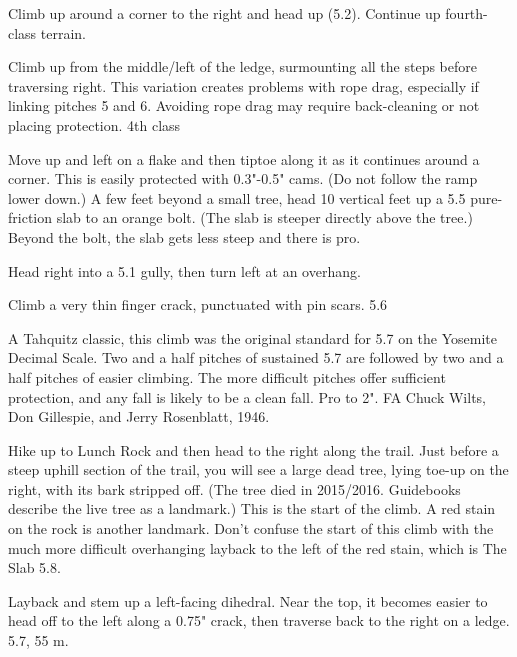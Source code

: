\documentclass{tahquitz}
\begin{document}
 Climb up around a corner to the right and head up (5.2).
Continue up fourth-class terrain.

 Climb up from the middle/left of the ledge, surmounting all the steps
before traversing right. This variation creates problems with rope drag, especially
if linking pitches 5 and 6. Avoiding rope drag may require back-cleaning or not
placing protection. 4th class

 Move up and left on a flake and then tiptoe along it as it
continues around a corner.  This is easily protected with 0.3"-0.5"
cams. (Do not follow the ramp lower down.)  A few feet beyond a small
tree, head 10 vertical feet up a 5.5 pure-friction slab to an orange bolt. (The slab
is steeper directly above the tree.) Beyond the bolt, the slab gets
less steep and there is pro. 

 Head right into a 5.1 gully, then turn left at an overhang.

 Climb a very thin finger crack, punctuated with pin scars. 5.6

\somespace

\upfriction




A Tahquitz classic, this climb was the original standard for 5.7 on the Yosemite Decimal
Scale. Two and a half pitches of sustained 5.7 are followed by two and a half pitches
of easier climbing. The more difficult pitches offer sufficient protection, and any fall
is likely to be a clean fall. Pro to 2".
FA Chuck Wilts, Don Gillespie, and Jerry Rosenblatt, 1946.

Hike up to Lunch Rock and then head to the right along the
trail. Just before a steep uphill section of the trail, you
will see a large dead tree, lying toe-up on the right, with its
bark stripped off. (The tree died in 2015/2016.
Guidebooks describe the live tree as a landmark.) This
is the start of the climb. A red stain on the rock is another
landmark. Don't confuse the start of this climb with the much more
difficult overhanging layback to the left of the red stain,
which is The Slab 5.8.

\somespace

 Layback and stem up a left-facing dihedral. Near the top, it becomes easier to
head off to the left along a 0.75" crack, then traverse back to the right
on a ledge. 5.7, 55 m.
\end{document}
